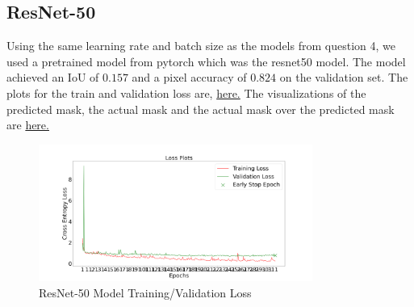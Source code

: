 \documentclass{article}
\begin{document}
\subsection{ResNet-50}
Using the same learning rate and batch size as the models from question 4, we used a pretrained model from pytorch which was the resnet50 model. The model achieved an IoU of $0.157$ and a pixel accuracy of $0.824$ on the validation set. The plots for the train and validation loss are, \hyperref[fig:resnet50_train_loss]{here.} The visualizations of the predicted mask, the actual mask and the actual mask over the predicted mask are \hyperref[fig:resnet50_masks_visualization]{here.}

\begin{figure}[h!]
  \centering
  \includegraphics[width=0.8\textwidth]{include/plots/train_5_b_loss.png}
  \caption{ResNet-50 Model Training/Validation Loss}
  \label{fig:resnet50_train_loss}
\end{figure}
\end{document}
